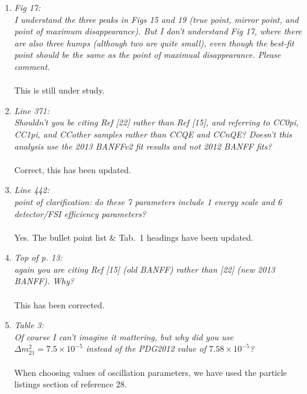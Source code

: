 \begin{enumerate}
  \vspace{5 mm}
\item
  {\em
    Fig 17:\\
    I understand the three peaks in Figs 15 and 19 (true point, mirror point, and point of maximum disappearance).
    But I don't understand Fig 17, where there are also three humps (although two are quite small), even
    though the best-fit point should be the same as the point of maximual disappearance.  Please comment.
  }\\
  \\
  This is still under study.

  \vspace{5 mm}
\item
  {\em
    Line 371:\\
    Shouldn't you be citing Ref [22] rather than Ref [15], and referring to CC0pi, CC1pi, and CCother samples rather
    than CCQE and CCnQE?  Doesn't this analysis use the 2013 BANFFv2 fit results and not 2012 BANFF fits?
  }\\
  \\
  Correct, this has been updated.

  \vspace{5 mm}
\item
  {\em
    Line 442:\\
    point of clarification: do these 7 parameters include 1 energy scale and 6 detector/FSI efficiency parameters?
  }\\
  \\
  Yes.
  The bullet point list \& Tab.\ 1 headings have been updated.
  
  \vspace{5 mm}
\item
  {\em
    Top of p. 13:\\
    again you are citing Ref [15] (old BANFF) rather than [22] (new 2013 BANFF).  Why?  
  }\\
  \\
  This has been corrected.

  \vspace{5 mm}
\item
  {\em
    Table 3:\\
    Of course I can't imagine it mattering, but why did you use $\Delta m^2_{21}=7.5\times 10^{-5}$
    instead of the PDG2012 value of $7.58\times 10^{-5}$?
  }\\
  \\
  When choosing values of oscillation parameters, we have used the particle
  listings section of reference 28.


\end{enumerate}
